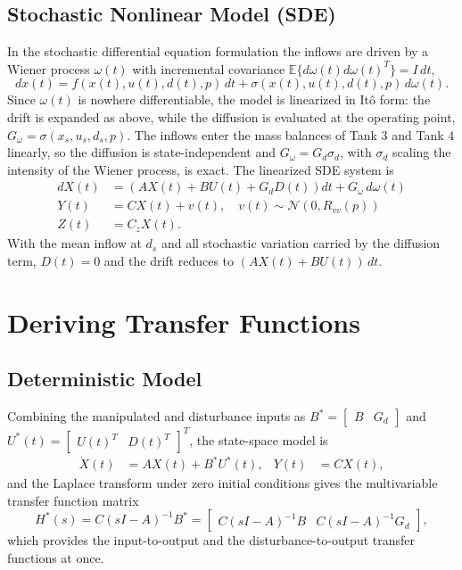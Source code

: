 \subsection{Stochastic Nonlinear Model (SDE)}

In the stochastic differential equation formulation the inflows are driven by a
Wiener process $\omega(t)$ with incremental covariance
$\mathbb{E}\{d\omega(t)d\omega(t)^T\} = I \, dt$,
\begin{equation}
    dx(t) = f(x(t), u(t), d(t), p) \, dt + \sigma(x(t), u(t), d(t), p) \, d\omega(t).
\end{equation}
Since $\omega(t)$ is nowhere differentiable, the model is linearized in
It\^o form: the drift is expanded as above, while the diffusion is evaluated at
the operating point, $G_\omega = \sigma(x_s, u_s, d_s, p)$. The inflows enter
the mass balances of Tank 3 and Tank 4 linearly, so the diffusion is
state-independent and $G_\omega = G_d \sigma_d$, with $\sigma_d$ scaling the
intensity of the Wiener process, is exact. The linearized SDE system is
\begin{align}
    dX(t) &= \left( A X(t) + B U(t) + G_d D(t) \right) dt + G_\omega \, d\omega(t) \\
    Y(t) &= C X(t) + v(t), \quad v(t) \sim \mathcal{N}(0, R_{vv}(p)) \\
    Z(t) &= C_z X(t).
\end{align}
With the mean inflow at $d_s$ and all stochastic variation carried by the
diffusion term, $D(t) = 0$ and the drift reduces to
$(A X(t) + B U(t)) \, dt$.

\section{Deriving Transfer Functions}

\subsection{Deterministic Model}

Combining the manipulated and disturbance inputs as
$B^* = \begin{bmatrix} B & G_d \end{bmatrix}$ and
$U^*(t) = \begin{bmatrix} U(t)^T & D(t)^T \end{bmatrix}^T$, the state-space
model is
\begin{align}
    \dot{X}(t) &= A X(t) + B^* U^*(t), & Y(t) &= C X(t),
\end{align}
and the Laplace transform under zero initial conditions gives the
multivariable transfer function matrix
\begin{equation}
    H^*(s) = C(sI - A)^{-1} B^* = \begin{bmatrix} C(sI - A)^{-1} B & C(sI - A)^{-1} G_d \end{bmatrix},
\end{equation}
which provides the input-to-output and the disturbance-to-output transfer
functions at once.

